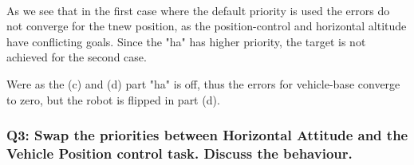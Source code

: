 \documentclass{article}
\begin{document}
\begin{figure}[!h]
	\hfill
	\hfill
	\hfill
	\\
\end{figure}

As we see that in the first case where the default priority is used the errors do not converge for the tnew position, as the position-control and horizontal altitude have conflicting goals. Since the "ha" has higher priority, the target is not achieved for the second case. 

Were as the (c) and (d) part "ha" is off, thus the errors for vehicle-base converge to zero, but the robot is flipped in part (d). 

\subsubsection{Q3: Swap the priorities between Horizontal Attitude and the Vehicle Position control task. Discuss the behaviour.}
\end{document}
